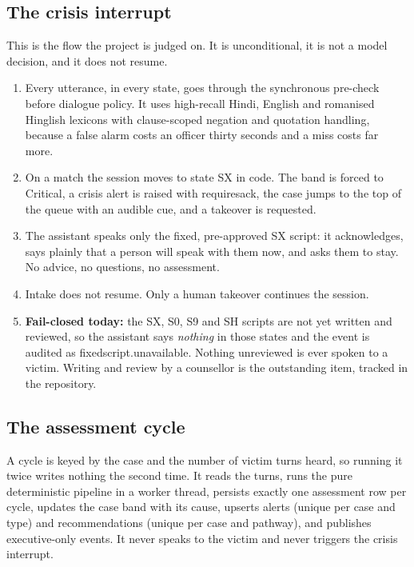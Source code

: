 \documentclass[11pt,a4paper]{article}
\newcommand{\codeus}{\textunderscore\allowbreak}
\DeclareRobustCommand{\code}[1]{{\ttfamily\let\_\codeus #1}}
\begin{document}
\subsection{The crisis interrupt}
\label{sec:crisisflow}
This is the flow the project is judged on. It is unconditional, it is not a model decision, and it
does not resume.

\begin{enumerate}[itemsep=1pt]
  \item Every utterance, in every state, goes through the synchronous pre-check before dialogue
        policy. It uses high-recall Hindi, English and romanised Hinglish lexicons with clause-scoped
        negation and quotation handling, because a false alarm costs an officer thirty seconds and a
        miss costs far more.
  \item On a match the session moves to state SX in code. The band is forced to Critical, a crisis
        alert is raised with \code{requires\_ack}, the case jumps to the top of the queue with an
        audible cue, and a takeover is requested.
  \item The assistant speaks only the fixed, pre-approved SX script: it acknowledges, says plainly
        that a person will speak with them now, and asks them to stay. No advice, no questions, no
        assessment.
  \item Intake does not resume. Only a human takeover continues the session.
  \item \textbf{Fail-closed today:} the SX, S0, S9 and SH scripts are not yet written and reviewed,
        so the assistant says \emph{nothing} in those states and the event is audited as
        \code{fixed\_script.unavailable}. Nothing unreviewed is ever spoken to a victim. Writing and
        review by a counsellor is the outstanding item, tracked in the repository.
\end{enumerate}

\subsection{The assessment cycle}
\label{sec:assessflow}
A cycle is keyed by the case and the number of victim turns heard, so running it twice writes nothing
the second time. It reads the turns, runs the pure deterministic pipeline in a worker thread,
persists exactly one assessment row per cycle, updates the case band with its cause, upserts alerts
(unique per case and type) and recommendations (unique per case and pathway), and publishes
executive-only events. It never speaks to the victim and never triggers the crisis interrupt.
\end{document}
